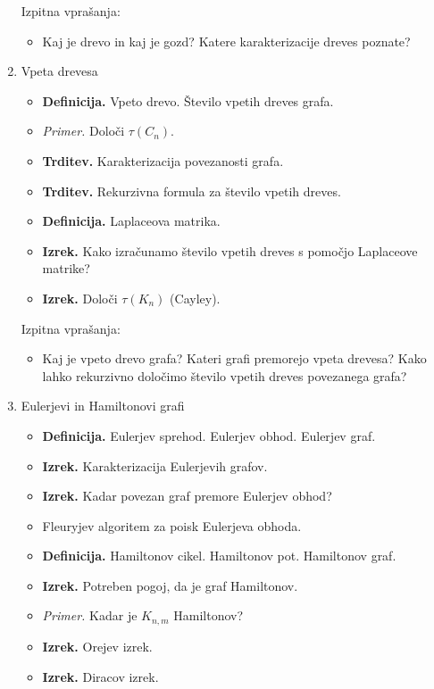 \begin{enumerate}
    Izpitna vprašanja:
    \begin{itemize}
        \item Kaj je drevo in kaj je gozd? Katere karakterizacije dreves poznate?
    \end{itemize}  

    \newpage
    \item Vpeta drevesa
    \begin{itemize}
        \item \colorbox{purple!30}{\textbf{Definicija.}} Vpeto drevo. Število vpetih dreves grafa.
        \item \colorbox{yellow!30}{\emph{Primer.}} Določi \(\tau (C_n)\).
        \item \colorbox{blue!30}{\textbf{Trditev.}} Karakterizacija povezanosti grafa.
        \item \colorbox{blue!30}{\textbf{Trditev.}} Rekurzivna formula za število vpetih dreves.
        \item \colorbox{purple!30}{\textbf{Definicija.}} Laplaceova matrika.
        \item \colorbox{blue!30}{\textbf{Izrek.}} Kako izračunamo število vpetih dreves s pomočjo Laplaceove matrike?
        \item \colorbox{blue!30}{\textbf{Izrek.}} Določi \(\tau(K_n)\) (Cayley).
    \end{itemize}

    Izpitna vprašanja:
    \begin{itemize}
        \item Kaj je vpeto drevo grafa? Kateri grafi premorejo vpeta drevesa? Kako lahko rekurzivno določimo število vpetih dreves povezanega grafa?
    \end{itemize}      

    \item Eulerjevi in Hamiltonovi grafi
    \begin{itemize}
        \item \colorbox{purple!30}{\textbf{Definicija.}} Eulerjev sprehod. Eulerjev obhod. Eulerjev graf.
        \item \colorbox{blue!30}{\textbf{Izrek.}} Karakterizacija Eulerjevih grafov.
        \item \colorbox{blue!30}{\textbf{Izrek.}} Kadar povezan graf premore Eulerjev obhod?
        \item Fleuryjev algoritem za poisk Eulerjeva obhoda.
        \item \colorbox{purple!30}{\textbf{Definicija.}} Hamiltonov cikel. Hamiltonov pot. Hamiltonov graf.
        \item \colorbox{blue!30}{\textbf{Izrek.}} Potreben pogoj, da je graf Hamiltonov.
        \item \colorbox{yellow!30}{\emph{Primer.}} Kadar je \(K_{n,m}\) Hamiltonov?
        \item \colorbox{blue!30}{\textbf{Izrek.}} Orejev izrek.
        \item \colorbox{blue!30}{\textbf{Izrek.}} Diracov izrek.
    \end{itemize}


\end{enumerate}
